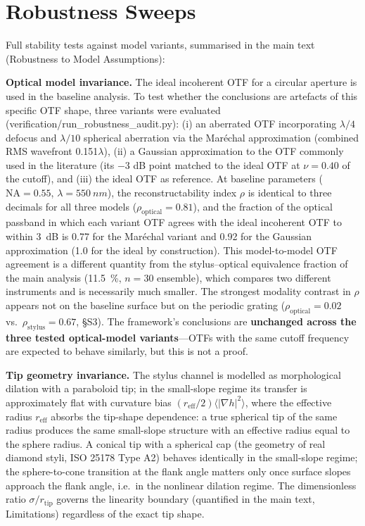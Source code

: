 \documentclass[review,12pt]{elsarticle}
\begin{document}
\section{Robustness Sweeps}
\label{S10}

Full stability tests against model variants, summarised in the main text (Robustness to Model Assumptions):

\textbf{Optical model invariance.} The ideal incoherent OTF for a circular aperture is used in the baseline analysis. To test whether the conclusions are artefacts of this specific OTF shape, three variants were evaluated (verification/run\_robustness\_audit.py): (i) an aberrated OTF incorporating $\lambda/4$ defocus and $\lambda/10$ spherical aberration via the Mar\'echal approximation (combined RMS wavefront 0.151$\lambda$), (ii) a Gaussian approximation to the OTF commonly used in the literature (its $-3$ dB point matched to the ideal OTF at $\nu = 0.40$ of the cutoff), and (iii) the ideal OTF as reference. At baseline parameters ($\mathrm{NA}=0.55$, $\lambda=\SI{550}{nm}$), the reconstructability index $\rho$ is identical to three decimals for all three models ($\rho_\mathrm{optical} = 0.81$), and the fraction of the optical passband in which each variant OTF agrees with the ideal incoherent OTF to within \SI{3}{dB} is 0.77 for the Mar\'echal variant and 0.92 for the Gaussian approximation (1.0 for the ideal by construction). This model-to-model OTF agreement is a different quantity from the stylus--optical equivalence fraction of the main analysis (\SI{11.5}{\percent}, $n=30$ ensemble), which compares two different instruments and is necessarily much smaller. The strongest modality contrast in $\rho$ appears not on the baseline surface but on the periodic grating ($\rho_\mathrm{optical} = 0.02$ vs.\ $\rho_\mathrm{stylus} = 0.67$, \S S3). The framework's conclusions are \textbf{unchanged across the three tested optical-model variants}---OTFs with the same cutoff frequency are expected to behave similarly, but this is not a proof.

\textbf{Tip geometry invariance.} The stylus channel is modelled as morphological dilation with a paraboloid tip; in the small-slope regime its transfer is approximately flat with curvature bias $(r_\mathrm{eff}/2)\langle|\nabla h|^2\rangle$, where the effective radius $r_\mathrm{eff}$ absorbs the tip-shape dependence: a true spherical tip of the same radius produces the same small-slope structure with an effective radius equal to the sphere radius. A conical tip with a spherical cap (the geometry of real diamond styli, ISO 25178 Type A2) behaves identically in the small-slope regime; the sphere-to-cone transition at the flank angle matters only once surface slopes approach the flank angle, i.e.\ in the nonlinear dilation regime. The dimensionless ratio $\sigma/r_\mathrm{tip}$ governs the linearity boundary (quantified in the main text, Limitations) regardless of the exact tip shape.
\end{document}
